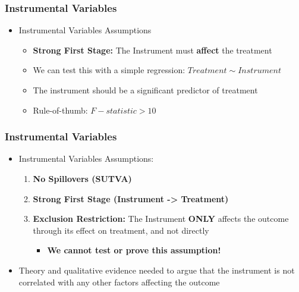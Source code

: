 \documentclass[xcolor=x11names,compress]{beamer}\usepackage[]{graphicx}\usepackage[]{xcolor}
\renewcommand{\(}{\begin{columns}}
\renewcommand{\)}{\end{columns}}
\newcommand{\<}[1]{\begin{column}{#1}}
\renewcommand{\>}{\end{column}}
\begin{document}
\begin{frame}
\frametitle{Instrumental Variables}
\begin{itemize}
\item Instrumental Variables Assumptions
\begin{itemize}
\item \textbf{Strong First Stage:} The Instrument must \textbf{affect} the treatment
\pause
\item We can test this with a simple regression: $Treatment \sim Instrument$
\pause
\item The instrument should be a significant predictor of treatment
\item Rule-of-thumb: $F-statistic > 10$
\end{itemize}
\end{itemize}
\end{frame}

\begin{frame}
\frametitle{Instrumental Variables}
\begin{itemize}
\item Instrumental Variables Assumptions:
\begin{enumerate}
\item \textbf{No Spillovers (SUTVA)}
\pause
\item \textbf{Strong First Stage (Instrument -> Treatment)}
\pause
\item \textbf{Exclusion Restriction:} The Instrument \textbf{ONLY} affects the outcome through its effect on treatment, and not directly
\pause
\begin{itemize}
\item \textbf{We cannot test or prove this assumption!}
\end{itemize}
\end{enumerate}
\pause
\item Theory and qualitative evidence needed to argue that the instrument is not correlated with any other factors affecting the outcome
\end{itemize}
\end{frame}
\end{document}
